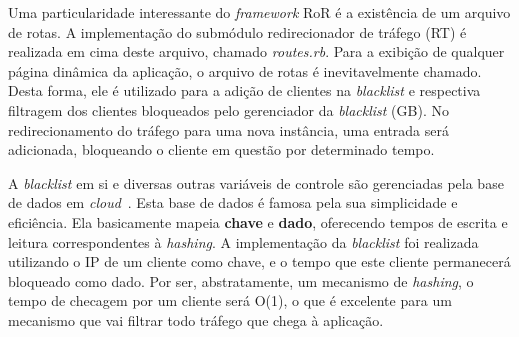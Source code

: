 Uma particularidade interessante do \emph{framework} RoR é a existência de um arquivo de rotas. A implementação do submódulo redirecionador de tráfego (RT) é realizada em cima deste arquivo, chamado \emph{routes.rb}. Para a exibição de qualquer página dinâmica da aplicação, o arquivo de rotas é inevitavelmente chamado. Desta forma, ele é utilizado para a adição de clientes na \emph{blacklist} e respectiva filtragem dos clientes bloqueados pelo gerenciador da \emph{blacklist} (GB). No redirecionamento do tráfego para uma nova instância, uma entrada será adicionada, bloqueando o cliente em questão por determinado tempo.


A \emph{blacklist} em si e diversas outras variáveis de controle são gerenciadas pela base de dados em \emph{cloud}~\cite{redis}. Esta base de dados é famosa pela sua simplicidade e eficiência. Ela basicamente mapeia \textbf{chave} e \textbf{dado}, oferecendo tempos de escrita e leitura correspondentes à \emph{hashing}. A implementação da \emph{blacklist} foi realizada utilizando o IP de um cliente como chave, e o tempo que este cliente permanecerá bloqueado como dado. Por ser, abstratamente, um mecanismo de \emph{hashing}, o tempo de checagem por um cliente será O(1), o que é excelente para um mecanismo que vai filtrar todo tráfego que chega à aplicação. %

